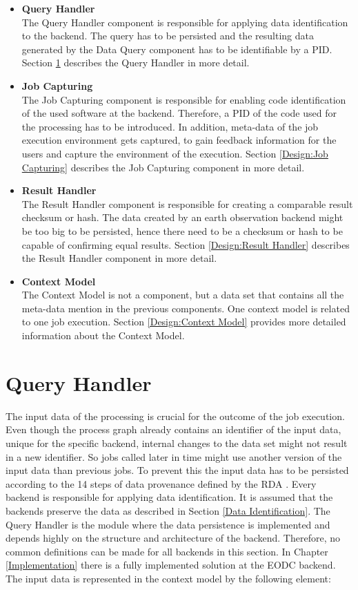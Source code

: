 \documentclass[draft,final]{vutinfth} %
\begin{document}
 \begin{itemize}
	\item \textbf{Query Handler} \\
	The Query Handler component is responsible for applying data identification to the backend. The query has to be persisted and the resulting data generated by the Data Query component has to be identifiable by a PID. Section \ref{Design:Data Identification} describes the Query Handler in more detail.     
	\item \textbf{Job Capturing} \\ 
	The Job Capturing component is responsible for enabling code identification of the used software at the backend. Therefore, a PID of the code used for the processing has to be introduced. In addition, meta-data of the job execution environment gets captured, to gain feedback information for the users and capture the environment of the execution. Section \ref{Design:Job Capturing} describes the Job Capturing component in more detail.
	\item \textbf{Result Handler} \\
	The Result Handler component is responsible for creating a comparable result checksum or hash. The data created by an earth observation backend might be too big to be persisted, hence there need to be a checksum or hash to be capable of confirming equal results. Section \ref{Design:Result Handler} describes the Result Handler component in more detail.   
	\item \textbf{Context Model} \\ 
	The Context Model is not a component, but a data set that contains all the meta-data mention in the previous components. One context model is related to one job execution. Section \ref{Design:Context Model} provides more detailed information about the Context Model. 
\end{itemize}

\section{Query Handler}\label{Design:Data Identification}
The input data of the processing is crucial for the outcome of the job execution. Even though the process graph already contains an identifier of the input data, unique for the specific backend, internal changes to the data set might not result in a new identifier. So jobs called later in time might use another version of the input data than previous jobs. To prevent this the input data has to be persisted according to the 14 steps of data provenance defined by the RDA \cite{rauber2016identification}. Every backend is responsible for applying data identification. It is assumed that the backends preserve the data as described in Section \ref{Data Identification}. The Query Handler is the module where the data persistence is implemented and depends highly on the structure and architecture of the backend. Therefore, no common definitions can be made for all backends in this section. In Chapter \ref{Implementation} there is a fully implemented solution at the EODC backend. The input data is represented in the context model by the following element: 
\end{document}
